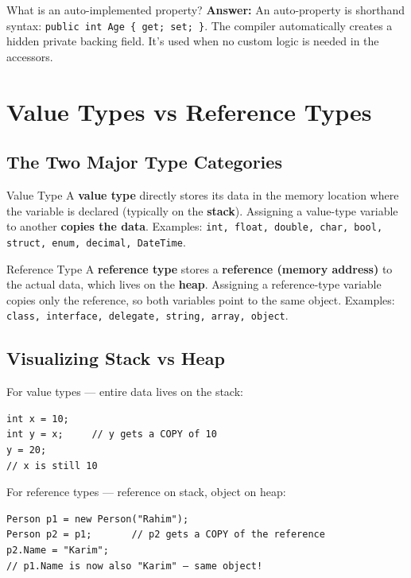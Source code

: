 \documentclass[11pt,a4paper]{article}
\begin{document}
\begin{intqBox}{What is an auto-implemented property?}
\textbf{Answer:} An auto-property is shorthand syntax: \texttt{public int Age \{ get; set; \}}. The compiler automatically creates a hidden private backing field. It's used when no custom logic is needed in the accessors.
\end{intqBox}

\clearpage
\section{Value Types vs Reference Types}

\subsection{The Two Major Type Categories}

\begin{defnBox}{Value Type}
A \textbf{value type} directly stores its data in the memory location where the variable is declared (typically on the \textbf{stack}). Assigning a value-type variable to another \textbf{copies the data}. Examples: \texttt{int, float, double, char, bool, struct, enum, decimal, DateTime}.
\end{defnBox}

\begin{defnBox}{Reference Type}
A \textbf{reference type} stores a \textbf{reference (memory address)} to the actual data, which lives on the \textbf{heap}. Assigning a reference-type variable copies only the reference, so both variables point to the same object. Examples: \texttt{class, interface, delegate, string, array, object}.
\end{defnBox}

\subsection{Visualizing Stack vs Heap}

For value types — entire data lives on the stack:
\begin{verbatim}
int x = 10;
int y = x;     // y gets a COPY of 10
y = 20;
// x is still 10
\end{verbatim}

For reference types — reference on stack, object on heap:
\begin{verbatim}
Person p1 = new Person("Rahim");
Person p2 = p1;       // p2 gets a COPY of the reference
p2.Name = "Karim";
// p1.Name is now also "Karim" — same object!
\end{verbatim}
\end{document}
